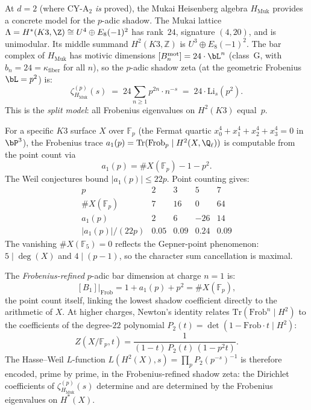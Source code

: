 \begin{remark}[The \texorpdfstring{$p$}{p}-adic shadow for \texorpdfstring{$K3$}{K3} at \texorpdfstring{$d=2$}{d=2}]
\label{rem:padic-shadow-k3}
At $d=2$ (where CY-A$_2$ \emph{is} proved), the Mukai Heisenberg algebra $H_{\mathrm{Muk}}$ provides a concrete model for the $p$-adic shadow. The Mukai lattice $\Lambda = H^*(K3, \Z) \cong U^4 \oplus E_8(-1)^2$ has rank~$24$, signature $(4, 20)$, and is unimodular. Its middle summand $H^2(K3,\mathbb Z)$ is $U^3\oplus E_8(-1)^2$. The bar complex of $H_{\mathrm{Muk}}$ has motivic dimensions $[B_n^{\mathrm{mot}}] = 24 \cdot \bL^n$ (class~G, with $b_n = 24 = \kappa_{\mathrm{fiber}}$ for all $n$), so the $p$-adic shadow zeta (at the geometric Frobenius $\bL = p^2$) is:
\begin{equation}
\label{eq:k3-padic-shadow-split}
 \zeta_{H_{\mathrm{Muk}}}^{(p)}(s) \;=\; 24 \sum_{n \geq 1} p^{2n} \cdot n^{-s} \;=\; 24 \cdot \mathrm{Li}_s(p^2).
\end{equation}
This is the \emph{split model}: all Frobenius eigenvalues on $H^2(K3)$ equal~$p$.

For a specific $K3$ surface $X$ over $\mathbb{F}_p$ (the Fermat quartic $x_0^4 + x_1^4 + x_2^4 + x_3^4 = 0$ in $\bP^3$), the Frobenius trace $a_1(p) = \mathrm{Tr}(\mathrm{Frob}_p \mid H^2(X, \Q_\ell))$ is computable from the point count via
\[
 a_1(p) = \#X(\mathbb{F}_p) - 1 - p^2.
\]
The Weil conjectures bound \( |a_1(p)|\leq 22p \). Point counting gives:
\[
 \begin{array}{c|cccc}
 p & 2 & 3 & 5 & 7 \\ \hline
 \#X(\mathbb{F}_p) & 7 & 16 & 0 & 64 \\
 a_1(p) & 2 & 6 & -26 & 14 \\
 |a_1(p)| / (22p) & 0.05 & 0.09 & 0.24 & 0.09
 \end{array}
\]
The vanishing $\#X(\mathbb{F}_5) = 0$ reflects the Gepner-point phenomenon: $5 \mid \deg(X)$ and $4 \mid (p-1)$, so the character sum cancellation is maximal.

The \emph{Frobenius-refined} $p$-adic bar dimension at charge $n=1$ is:
\[
 [B_1]|_{\mathrm{Frob}} = 1 + a_1(p) + p^2 = \#X(\mathbb{F}_p),
\]
the point count itself, linking the lowest shadow coefficient directly to the arithmetic of $X$. At higher charges, Newton's identity relates $\mathrm{Tr}(\mathrm{Frob}^n \mid H^2)$ to the coefficients of the degree-$22$ polynomial $P_2(t) = \det(1 - \mathrm{Frob} \cdot t \mid H^2)$:
\[
 Z(X/\mathbb{F}_p, t) = \frac{1}{(1-t) \, P_2(t) \, (1-p^2 t)}.
\]
The Hasse--Weil $L$-function $L(H^2(X), s) = \prod_p P_2(p^{-s})^{-1}$ is therefore encoded, prime by prime, in the Frobenius-refined shadow zeta: the Dirichlet coefficients of $\zeta_{H_{\mathrm{Muk}}}^{(p)}(s)$ determine and are determined by the Frobenius eigenvalues on $H^*(X)$.


\end{remark}
